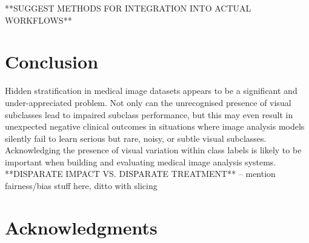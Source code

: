 \documentclass{article}
\begin{document}
 **SUGGEST METHODS FOR INTEGRATION INTO ACTUAL WORKFLOWS**


\section{Conclusion}

Hidden stratification in medical image datasets appears to be a significant and under-appreciated problem. Not only can the unrecognised presence of visual subclasses lead to impaired subclass performance, but this may even result in unexpected negative clinical outcomes in situations where image analysis models silently fail to learn serious but rare, noisy, or subtle visual subclasses.
Acknowledging the presence of visual variation within class labels is likely to be important when building and evaluating medical image analysis systems.
**DISPARATE IMPACT VS. DISPARATE TREATMENT** -- mention fairness/bias stuff here, ditto with slicing


\section*{Acknowledgments}



\end{document}
